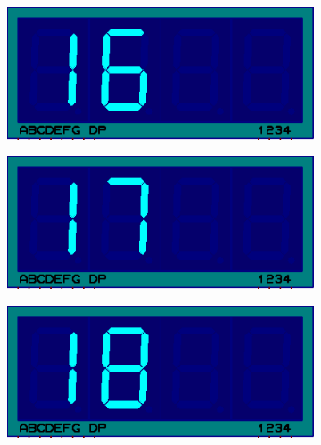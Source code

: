 \documentclass{lab_sheet}
\begin{document}
\begin{figure}[H]
\begin{subfigure}{.33\textwidth}
          \caption{}
          \label{fig:prob2-p}
        \end{subfigure}
        \begin{subfigure}{.33\textwidth}
          \centering
          \includegraphics[frame,width=.9\linewidth]{../Figures/d16}   
          \caption{}
          \label{fig:prob2-q}
        \end{subfigure}
        \begin{subfigure}{.33\textwidth}
          \centering
          \includegraphics[frame,width=.9\linewidth]{../Figures/d17}   
          \caption{}
          \label{fig:prob2-r}
        \end{subfigure}
        \newline
        \begin{subfigure}{.33\textwidth}
          \centering
          \includegraphics[frame,width=.9\linewidth]{../Figures/d18}   
          \caption{}
          \label{fig:prob2-s}
        \end{subfigure}

\end{figure}
\end{document}
